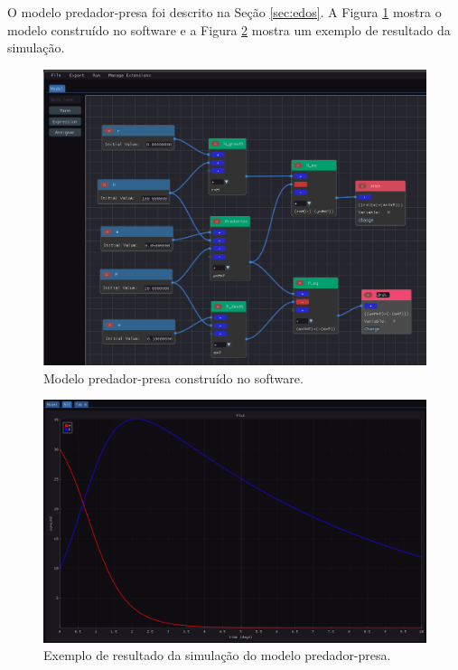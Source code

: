 \documentclass[
	12pt,				%
	openright,			%
	oneside,			%
	a4paper,			%
	main=brazil,
	english,			%
	]{ufsj-abntex2}
\begin{document}
O modelo predador-presa foi descrito na Seção \ref{sec:edos}. A Figura \ref{fig:predador-presa} mostra o modelo construído no software e a Figura \ref{fig:resultado-predador-presa} mostra um exemplo de resultado da simulação. 

\begin{figure}[h]
    \centering
    \includegraphics[width=\textwidth]{imgs/modelos/predador-presa.png} 
    \caption{Modelo predador-presa construído no software.}
    \label{fig:predador-presa}
\end{figure}

\begin{figure}[h]
    \centering
    \includegraphics[width=\textwidth]{imgs/modelos/resultado-predador-presa.png} 
    \caption{Exemplo de resultado da simulação do modelo predador-presa.}
    \label{fig:resultado-predador-presa}
\end{figure}
\end{document}
